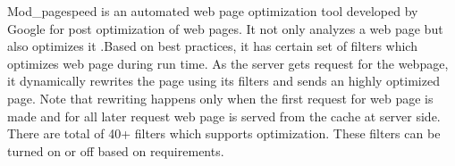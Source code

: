 \documentclass[conference]{IEEEtran}
\begin{document}
Mod\_pagespeed is an automated web page optimization tool developed by Google for post
optimization of web pages. It not only
analyzes a web page but also optimizes it .Based on best practices, it has
certain set of filters which optimizes web page during run time. As the server
gets request for the webpage, it dynamically rewrites the page using its filters
and sends an highly optimized page. Note that rewriting happens only when the first
request for web page is made and for all later request web page is served from the cache
at server side. There are total of 40+ filters which supports
optimization. These filters can be turned on or off based on requirements. 
\end{document}
